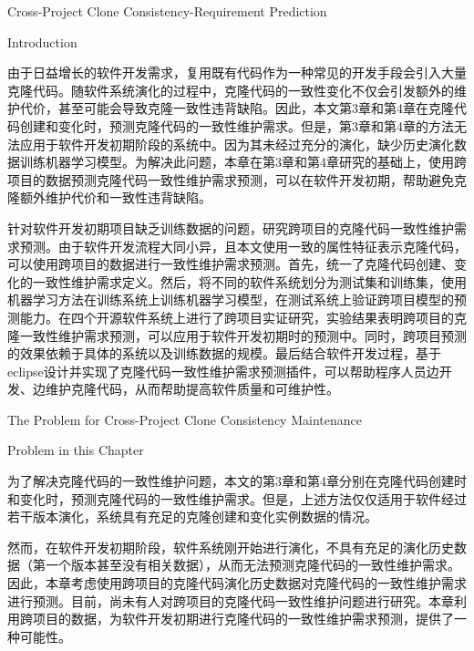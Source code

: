 
{Cross-Project Clone Consistency-Requirement Prediction}

{Introduction}

由于日益增长的软件开发需求，复用既有代码作为一种常见的开发手段会引入大量克隆代码。随软件系统演化的过程中，克隆代码的一致性变化不仅会引发额外的维护代价，甚至可能会导致克隆一致性违背缺陷。因此，本文第3章和第4章在克隆代码创建和变化时，预测克隆代码的一致性维护需求。但是，第3章和第4章的方法无法应用于软件开发初期阶段的系统中。因为其未经过充分的演化，缺少历史演化数据训练机器学习模型。为解决此问题，本章在第3章和第4章研究的基础上，使用跨项目的数据预测克隆代码一致性维护需求预测，可以在软件开发初期，帮助避免克隆额外维护代价和一致性违背缺陷。

针对软件开发初期项目缺乏训练数据的问题，研究跨项目的克隆代码一致性维护需求预测。由于软件开发流程大同小异，且本文使用一致的属性特征表示克隆代码，可以使用跨项目的数据进行一致性维护需求预测。首先，统一了克隆代码创建、变化的一致性维护需求定义。然后，将不同的软件系统划分为测试集和训练集，使用机器学习方法在训练系统上训练机器学习模型，在测试系统上验证跨项目模型的预测能力。在四个开源软件系统上进行了跨项目实证研究，实验结果表明跨项目的克隆一致性维护需求预测，可以应用于软件开发初期时的预测中。同时，跨项目预测的效果依赖于具体的系统以及训练数据的规模。最后结合软件开发过程，基于eclipse设计并实现了克隆代码一致性维护需求预测插件，可以帮助程序人员边开发、边维护克隆代码，从而帮助提高软件质量和可维护性。

{The Problem for Cross-Project Clone Consistency Maintenance}

{Problem in this Chapter}


为了解决克隆代码的一致性维护问题，本文的第3章和第4章分别在克隆代码创建时和变化时，预测克隆代码的一致性维护需求。但是，上述方法仅仅适用于软件经过若干版本演化，系统具有充足的克隆创建和变化实例数据的情况。

然而，在软件开发初期阶段，软件系统刚开始进行演化，不具有充足的演化历史数据（第一个版本甚至没有相关数据），从而无法预测克隆代码的一致性维护需求。因此，本章考虑使用跨项目的克隆代码演化历史数据对克隆代码的一致性维护需求进行预测。目前，尚未有人对跨项目的克隆代码一致性维护问题进行研究。本章利用跨项目的数据，为软件开发初期进行克隆代码的一致性维护需求预测，提供了一种可能性。

